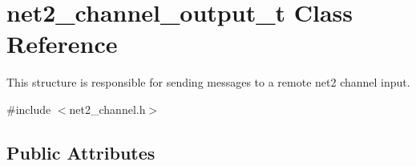 \hypertarget{structnet2__channel__output__t}{\section{net2\-\_\-channel\-\_\-output\-\_\-t Class Reference}
\label{structnet2__channel__output__t}
}


This structure is responsible for sending messages to a remote net2 channel input.  




{\ttfamily \#include $<$net2\-\_\-channel.\-h$>$}

\subsection*{Public Attributes}
